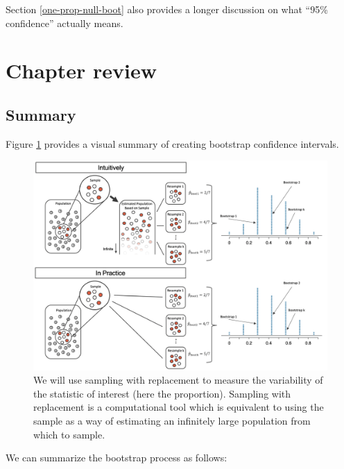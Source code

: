 \documentclass[
  10pt,
  openany]{book}
\begin{document}
Section \ref{one-prop-null-boot} also provides a longer discussion on what ``95\% confidence'' actually means.

\clearpage

\hypertarget{chp12-review}{%
\section{Chapter review}\label{chp12-review}}

\hypertarget{summary-6}{%
\subsection{Summary}\label{summary-6}}

Figure \ref{fig:bootboth} provides a visual summary of creating bootstrap confidence intervals.

\begin{figure}[h]

{\centering \includegraphics[width=0.95\linewidth]{images/boot1propboth} 

}

\caption{We will use sampling with replacement to measure the variability of the statistic of interest (here the proportion). Sampling with replacement is a computational tool which is equivalent to using the sample as a way of estimating an infinitely large population from which to sample.}\label{fig:bootboth}
\end{figure}

We can summarize the bootstrap process as follows:
\end{document}
